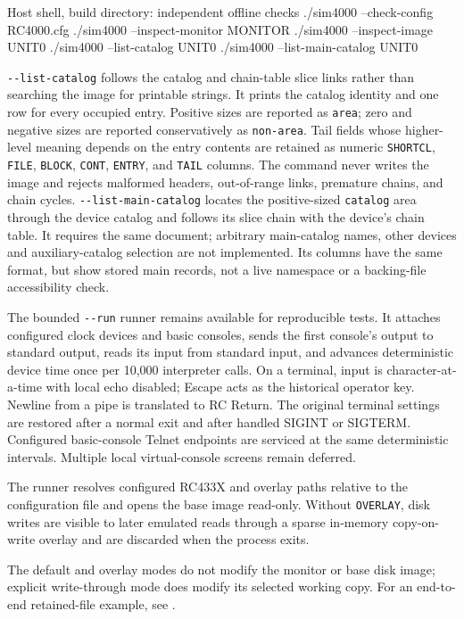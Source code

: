 \begin{commandexample}[language=sh]{Host shell, build directory: independent offline checks}
./sim4000 --check-config RC4000.cfg
./sim4000 --inspect-monitor MONITOR
./sim4000 --inspect-image UNIT0
./sim4000 --list-catalog UNIT0
./sim4000 --list-main-catalog UNIT0
\end{commandexample}

\passthrough{\lstinline!--list-catalog!} follows the catalog and chain-table slice links rather than searching the image for printable strings. It prints the catalog identity and one row for every occupied entry. Positive sizes are reported as \passthrough{\lstinline!area!}; zero and negative sizes are reported conservatively as \passthrough{\lstinline!non-area!}. Tail fields whose higher-level meaning depends on the entry contents are retained as numeric \passthrough{\lstinline!SHORTCL!}, \passthrough{\lstinline!FILE!}, \passthrough{\lstinline!BLOCK!}, \passthrough{\lstinline!CONT!}, \passthrough{\lstinline!ENTRY!}, and \passthrough{\lstinline!TAIL!} columns. The command never writes the image and rejects malformed headers, out-of-range links, premature chains, and chain cycles. \passthrough{\lstinline!--list-main-catalog!} locates the positive-sized \passthrough{\lstinline!catalog!} area through the device catalog and follows its slice chain with the device's chain table. It requires the same document; arbitrary main-catalog names, other devices and auxiliary-catalog selection are not implemented. Its columns have the same format, but show stored main records, not a live namespace or a backing-file accessibility check.

The bounded \passthrough{\lstinline!--run!} runner remains available for reproducible tests. It attaches configured clock devices and basic consoles, sends the first console's output to standard output, reads its input from standard input, and advances deterministic device time once per 10,000 interpreter calls. On a terminal, input is character-at-a-time with local echo disabled; Escape acts as the historical operator key. Newline from a pipe is translated to RC Return. The original terminal settings are restored after a normal exit and after handled SIGINT or SIGTERM. Configured basic-console Telnet endpoints are serviced at the same deterministic intervals. Multiple local virtual-console screens remain deferred.

The runner resolves configured RC433X and overlay paths relative to the configuration file and opens the base image read-only. Without \passthrough{\lstinline!OVERLAY!}, disk writes are visible to later emulated reads through a sparse in-memory copy-on-write overlay and are discarded when the process exits.

The default and overlay modes do not modify the monitor or base disk image; explicit write-through mode does modify its selected working copy. For an end-to-end retained-file example, see .
